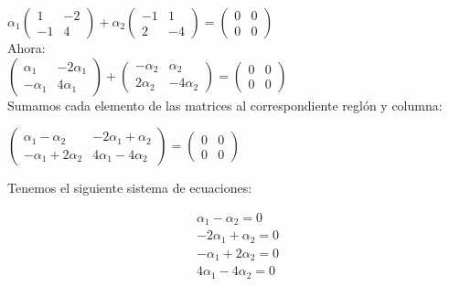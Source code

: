 \documentclass[letterpaper]{article}
\renewcommand{\*}{\cdot}
\theoremstyle{definition}
\begin{document}
$\alpha_1 \begin{pmatrix} 1 & -2 \\ -1 & 4 \end{pmatrix}  + \alpha_2 \begin{pmatrix} -1 & 1 \\ 2 & -4 \end{pmatrix} = \begin{pmatrix}
0 & 0 \\ 0 & 0 \end{pmatrix}$\\

Ahora:\\

$\begin{pmatrix} \alpha_1 & -2\alpha_{1} \\ -\alpha_{1} & 4\alpha_{1} \end{pmatrix} +
\begin{pmatrix} -\alpha_{2} & \alpha_2 \\ 2\alpha_{2} & -4\alpha_{2} \end{pmatrix} = \begin{pmatrix} 	0 & 0 \\ 0 & 0 \end{pmatrix}$\\

Sumamos cada elemento de las matrices al correspondiente reglón y columna:\\

\begin{center}
	$\begin{pmatrix}
	\alpha_{1}-\alpha_{2} & -2\alpha_{1}+\alpha_{2} \\ -\alpha_{1}+2\alpha_{2} & 4\alpha_{1}-4\alpha_{2}
	\end{pmatrix} = \begin{pmatrix}
	0 & 0 \\ 0 & 0
	\end{pmatrix}$
\end{center}

Tenemos el siguiente sistema de ecuaciones:
\begin{center}
	\begin{align*}
	\alpha_{1}-\alpha_{2} = 0\\
	-2\alpha_{1} + \alpha_{2} = 0\\
	-\alpha_{1}+2\alpha_{2}= 0\\
	4\alpha_{1}-4\alpha_{2}= 0
	\end{align*}
\end{center}
\end{document}
